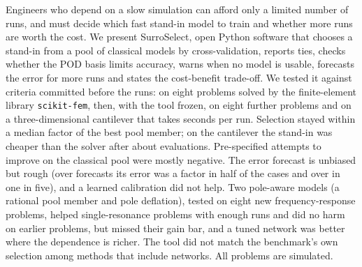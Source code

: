 Engineers who depend on a slow simulation can afford only a limited number of runs, and must decide which fast stand-in model to train and whether more runs are worth the cost. We present SurroSelect, open Python software that chooses a stand-in from a pool of classical models by cross-validation, reports ties, checks whether the POD basis limits accuracy, warns when no model is usable, forecasts the error for more runs and states the cost-benefit trade-off. We tested it against criteria committed before the runs: on eight problems solved by the finite-element library \texttt{scikit-fem}, then, with the tool frozen, on eight further problems and on a three-dimensional cantilever that takes \SeTsim{} seconds per run. Selection stayed within a median factor \SvSoneMedian{} of the best pool member; on the cantilever the stand-in was cheaper than the solver after about \SeBreakWith{} evaluations. Pre-specified attempts to improve on the classical pool were mostly negative. The error forecast is unbiased but rough (over \SfAllCases{} forecasts its error was a factor \SfQHalf{} in half of the cases and over \SfQEighty{} in one in five), and a learned calibration did not help. Two pole-aware models (a rational pool member and pole deflation), tested on eight new frequency-response problems, helped single-resonance problems with enough runs and did no harm on \SrSixN{} earlier problems, but missed their gain bar, and a tuned network was better where the dependence is richer. The tool did not match the benchmark's own selection among methods that include networks. All problems are simulated.
